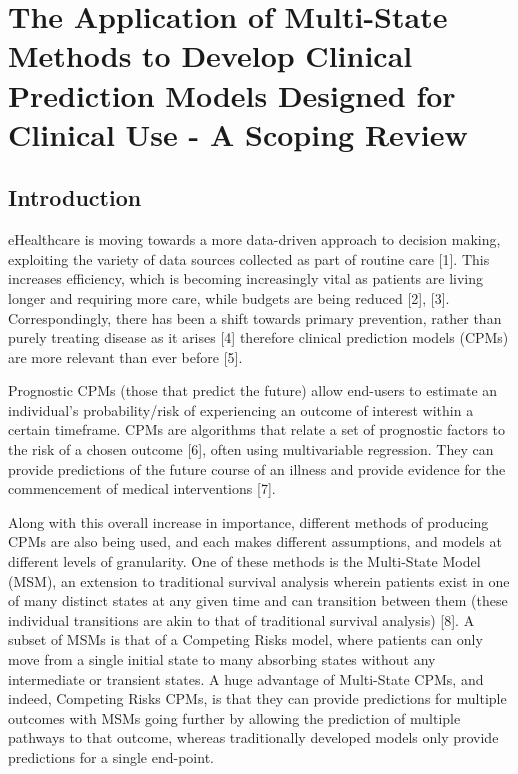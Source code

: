 \documentclass[12pt,twoside]{reedthesis}
\begin{document}
\hypertarget{chap-scoping-review}{%
\chapter{The Application of Multi-State Methods to Develop Clinical Prediction Models Designed for Clinical Use - A Scoping Review}\label{chap-scoping-review}}

\hypertarget{introduction-1}{%
\section{Introduction}\label{introduction-1}}

eHealthcare is moving towards a more data-driven approach to decision making, exploiting the variety of data sources collected as part of routine care {[}1{]}. This increases efficiency, which is becoming increasingly vital as patients are living longer and requiring more care, while budgets are being reduced {[}2{]}, {[}3{]}. Correspondingly, there has been a shift towards primary prevention, rather than purely treating disease as it arises {[}4{]} therefore clinical prediction models (CPMs) are more relevant than ever before {[}5{]}.

Prognostic CPMs (those that predict the future) allow end-users to estimate an individual's probability/risk of experiencing an outcome of interest within a certain timeframe. CPMs are algorithms that relate a set of prognostic factors to the risk of a chosen outcome {[}6{]}, often using multivariable regression. They can provide predictions of the future course of an illness and provide evidence for the commencement of medical interventions {[}7{]}.

Along with this overall increase in importance, different methods of producing CPMs are also being used, and each makes different assumptions, and models at different levels of granularity. One of these methods is the Multi-State Model (MSM), an extension to traditional survival analysis wherein patients exist in one of many distinct states at any given time and can transition between them (these individual transitions are akin to that of traditional survival analysis) {[}8{]}. A subset of MSMs is that of a Competing Risks model, where patients can only move from a single initial state to many absorbing states without any intermediate or transient states. A huge advantage of Multi-State CPMs, and indeed, Competing Risks CPMs, is that they can provide predictions for multiple outcomes with MSMs going further by allowing the prediction of multiple pathways to that outcome, whereas traditionally developed models only provide predictions for a single end-point.
\end{document}
